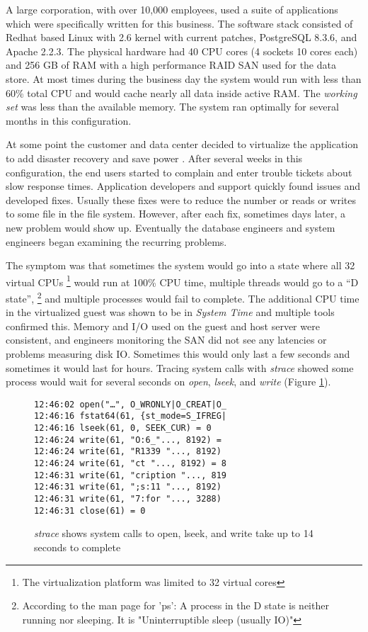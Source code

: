 A large corporation, with over 10,000 employees, used a suite of applications which were specifically written for this business. The software stack consisted of Redhat based Linux with 2.6 kernel with current patches, PostgreSQL 8.3.6, and Apache 2.2.3.  The physical hardware had 40 CPU cores (4 sockets 10 cores each) and 256 GB of RAM with a high performance RAID SAN used for the data store.  At most times during the business day the system would run with less than 60\% total CPU and would cache nearly all data inside active RAM.  The \emph{working set} was less than the available memory.  The system ran optimally for several months in this configuration.

\indent At some point the customer and data center decided to virtualize the application to add disaster recovery \cite{wood} and save power \cite{lim}.  After several weeks in this configuration, the end users started to complain and enter trouble tickets about slow response times.  Application developers and support quickly found issues and developed fixes.   Usually these fixes were to reduce the number or reads or writes to some file in the file system.  However, after each fix, sometimes days later, a new problem would show up.  Eventually the database engineers and system engineers began examining the recurring problems.

\indent The symptom was that sometimes the system would go into a state where all 32 virtual CPUs \footnote{The virtualization platform was limited to 32 virtual cores} would run at 100\% CPU time, multiple threads would go to a “D state”, \footnote{According to the man page for 'ps':  A process in the D state is neither running nor sleeping.  It is "Uninterruptible sleep (usually IO)"} and multiple processes would fail to complete.  The additional CPU time in the virtualized guest was shown to be in \emph{System Time} and multiple tools confirmed this.  Memory and I/O used on the guest and host server were consistent, and engineers monitoring the SAN did not see any latencies or problems measuring disk IO.  Sometimes this would only last a few seconds and sometimes it would last for hours.  Tracing system calls with \emph{strace} showed some process would wait for several seconds on \emph{open}, \emph{lseek}, and \emph{write} (Figure \ref{fig:syscall}).

\begin{figure}[h]
\begingroup
    \fontsize{10pt}{12pt}\selectfont
\begin{Verbatim}
12:46:02 open("…", O_WRONLY|O_CREAT|O_
12:46:16 fstat64(61, {st_mode=S_IFREG| 
12:46:16 lseek(61, 0, SEEK_CUR) = 0 
12:46:24 write(61, "O:6_"..., 8192) =  
12:46:24 write(61, "R1339 "..., 8192)  
12:46:24 write(61, "ct "..., 8192) = 8 
12:46:31 write(61, "cription "..., 819  
12:46:31 write(61, ";s:11 "..., 8192)  
12:46:31 write(61, "7:for "..., 3288)  
12:46:31 close(61) = 0
\end{Verbatim}
\endgroup
\caption{\emph{strace} shows system calls to open, lseek, and write take up to 14 seconds to complete}
\label{fig:syscall}
\end{figure}

